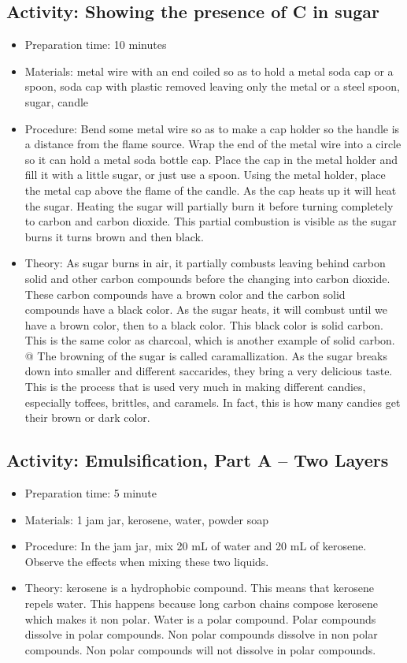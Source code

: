 \begin{itemize}
{\begin{itemize}
\begin{itemize}
{\subsection{Activity: Showing the presence of C in sugar}
\begin{itemize}
\item{Preparation time: 10 minutes}
\item{Materials: metal wire with an end coiled so as to hold a metal soda cap or a spoon, soda cap with plastic removed leaving only the metal or a steel spoon, sugar, candle}
\item{Procedure: Bend some metal wire so as to make a cap holder so the handle is a distance from the flame source. Wrap the end of the metal wire into a circle so it can hold a metal soda bottle cap. Place the cap in the metal holder and fill it with a little sugar, or just use a spoon. Using the metal holder, place the metal cap above the flame of the candle. As the cap heats up it will heat the sugar. Heating the sugar will partially burn it before turning completely to carbon and carbon dioxide. This partial combustion is visible as the sugar burns it turns brown and then black.}
\item{Theory:  As sugar burns in air, it partially combusts leaving behind carbon solid and other carbon compounds before the changing into carbon dioxide. These carbon compounds have a brown color and the carbon solid compounds have a black color. As the sugar heats, it will combust until we have a brown color, then to a black color. This black color is solid carbon. This is the same color as charcoal, which is another example of solid carbon. @	The browning of the sugar is called caramallization. As the sugar breaks down into smaller and different saccarides, they bring a very delicious taste. This is the process that is used very much in making different candies, especially toffees, brittles, and caramels. In fact, this is how many candies get their brown or dark color.}
\end{itemize}

\subsection{Activity: Emulsification, Part A – Two Layers}
\begin{itemize}
\item{Preparation time: 5 minute}
\item{Materials: 1 jam jar, kerosene, water, powder soap}
\item{Procedure: In the jam jar, mix 20 mL of water and 20 mL of kerosene. Observe the effects when mixing these two liquids.}
\item{Theory: kerosene is a hydrophobic compound. This means that kerosene repels water. This happens because long carbon chains compose kerosene which makes it non polar. Water is a polar compound. Polar compounds dissolve in polar compounds. Non polar compounds dissolve in non polar compounds. Non polar compounds will not dissolve in polar compounds.}
\end{itemize}

}
\end{itemize}
\end{itemize}}
\end{itemize}
